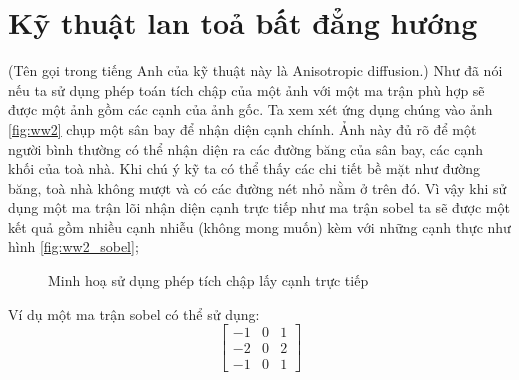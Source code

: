 
\section{Kỹ thuật lan toả bất đẳng hướng}
(Tên gọi trong tiếng Anh của kỹ thuật này là Anisotropic diffusion.)
Như đã nói nếu ta sử dụng phép toán tích chập của một ảnh với một ma trận phù hợp sẽ được một ảnh gồm các cạnh của ảnh gốc. Ta xem xét ứng dụng chúng vào ảnh \ref{fig:ww2} chụp một sân bay để nhận diện cạnh chính. Ảnh này đủ rõ để một người bình thường có thể nhận diện ra các đường băng của sân bay, các cạnh khối của toà nhà. Khi chú ý kỹ ta có thể thấy các chi tiết bề mặt như đường băng, toà nhà không mượt và có các đường nét nhỏ nằm ở trên đó. Vì vậy khi sử dụng một ma trận lõi nhận diện cạnh trực tiếp như ma trận sobel ta sẽ được một kết quả gồm nhiều cạnh nhiễu (không mong muốn) kèm với những cạnh thực như hình \ref{fig:ww2_sobel}; \\

\begin{figure}
  \centering
  \caption{Minh hoạ sử dụng phép tích chập lấy cạnh trực tiếp}
  \label{fig:simplesobel}
\end{figure}

Ví dụ một ma trận sobel có thể sử dụng:
$$\begin{bmatrix}
-1 & 0 & 1\\ 
-2 & 0 & 2\\ 
-1 & 0 & 1
\end{bmatrix}$$

